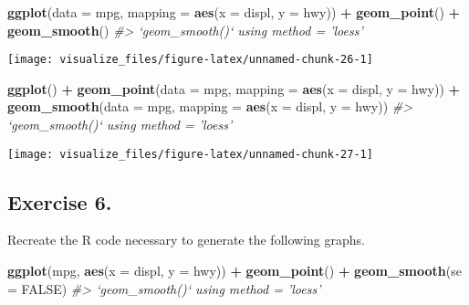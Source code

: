 \documentclass[]{book}
\newenvironment{Shaded}{\begin{snugshade}}{\end{snugshade}}
\newcommand{\CommentTok}[1]{\textcolor[rgb]{0.56,0.35,0.01}{\textit{#1}}}
\newcommand{\DataTypeTok}[1]{\textcolor[rgb]{0.13,0.29,0.53}{#1}}
\newcommand{\KeywordTok}[1]{\textcolor[rgb]{0.13,0.29,0.53}{\textbf{#1}}}
\newcommand{\NormalTok}[1]{#1}
\newcommand{\OperatorTok}[1]{\textcolor[rgb]{0.81,0.36,0.00}{\textbf{#1}}}
\newcommand{\OtherTok}[1]{\textcolor[rgb]{0.56,0.35,0.01}{#1}}
\newcommand{\StringTok}[1]{\textcolor[rgb]{0.31,0.60,0.02}{#1}}
\theoremstyle{definition}
\theoremstyle{definition}
\theoremstyle{definition}
\theoremstyle{remark}
\begin{document}
\begin{Shaded}
\begin{Highlighting}[]
\KeywordTok{ggplot}\NormalTok{(}\DataTypeTok{data =}\NormalTok{ mpg, }\DataTypeTok{mapping =} \KeywordTok{aes}\NormalTok{(}\DataTypeTok{x =}\NormalTok{ displ, }\DataTypeTok{y =}\NormalTok{ hwy)) }\OperatorTok{+}\StringTok{ }
\StringTok{  }\KeywordTok{geom_point}\NormalTok{() }\OperatorTok{+}\StringTok{ }
\StringTok{  }\KeywordTok{geom_smooth}\NormalTok{()}
\CommentTok{#> `geom_smooth()` using method = 'loess'}
\end{Highlighting}
\end{Shaded}

\begin{center}\texttt{[image: visualize\_files/figure-latex/unnamed-chunk-26-1]} \end{center}

\begin{Shaded}
\begin{Highlighting}[]
\KeywordTok{ggplot}\NormalTok{() }\OperatorTok{+}\StringTok{ }
\StringTok{  }\KeywordTok{geom_point}\NormalTok{(}\DataTypeTok{data =}\NormalTok{ mpg, }\DataTypeTok{mapping =} \KeywordTok{aes}\NormalTok{(}\DataTypeTok{x =}\NormalTok{ displ, }\DataTypeTok{y =}\NormalTok{ hwy)) }\OperatorTok{+}\StringTok{ }
\StringTok{  }\KeywordTok{geom_smooth}\NormalTok{(}\DataTypeTok{data =}\NormalTok{ mpg, }\DataTypeTok{mapping =} \KeywordTok{aes}\NormalTok{(}\DataTypeTok{x =}\NormalTok{ displ, }\DataTypeTok{y =}\NormalTok{ hwy))}
\CommentTok{#> `geom_smooth()` using method = 'loess'}
\end{Highlighting}
\end{Shaded}

\begin{center}\texttt{[image: visualize\_files/figure-latex/unnamed-chunk-27-1]} \end{center}

\hypertarget{exercise-6.-2}{%
\subsection{Exercise 6.}\label{exercise-6.-2}}

Recreate the R code necessary to generate the following graphs.

\begin{Shaded}
\begin{Highlighting}[]
\KeywordTok{ggplot}\NormalTok{(mpg, }\KeywordTok{aes}\NormalTok{(}\DataTypeTok{x =}\NormalTok{ displ, }\DataTypeTok{y =}\NormalTok{ hwy)) }\OperatorTok{+}
\StringTok{  }\KeywordTok{geom_point}\NormalTok{() }\OperatorTok{+}
\StringTok{  }\KeywordTok{geom_smooth}\NormalTok{(}\DataTypeTok{se =} \OtherTok{FALSE}\NormalTok{)}
\CommentTok{#> `geom_smooth()` using method = 'loess'}
\end{Highlighting}
\end{Shaded}
\end{document}
